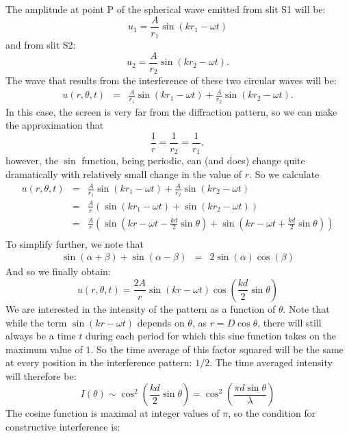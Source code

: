 \documentclass[12pt]{article}
\begin{document}
The amplitude at point P of the spherical wave emitted from slit S1 will be:
\begin{displaymath}
u_1 = \frac{A}{r_1} \sin(k r_1- \omega t)
\end{displaymath}
and from slit S2:
\begin{displaymath}
u_2 = \frac{A}{r_2} \sin(k r_2- \omega t).
\end{displaymath}
The wave that results from the interference of these two circular waves will be:
\begin{eqnarray*}
u(r,\theta,t) &=& \frac{A}{r_1} \sin(k r_1- \omega t) + \frac{A}{r_2} \sin(k r_2- \omega t).
\end{eqnarray*}
In this case, the screen is very far from the diffraction pattern, so we can make the approximation that
\begin{displaymath}
\frac{1}{r} = \frac{1}{r_2} = \frac{1}{r_1},
\end{displaymath}
however, the $\sin$ function, being periodic, can (and does) change quite dramatically with relatively small change in the value of $r$.  So we calculate
\begin{eqnarray*}
u(r,\theta,t) &=& \frac{A}{r_1} \sin(k r_1- \omega t) + \frac{A}{r_2} \sin(k r_2- \omega t) \\
&=& \frac{A}{r} \left( \sin(k r_1- \omega t) + \sin(k r_2- \omega t) \right) \\
&=& \frac{A}{r} \left( \sin(k r- \omega t - \frac{kd}{2}\sin\theta) + \sin(k r- \omega t +  \frac{kd}{2}\sin\theta) \right) \\
\end{eqnarray*}
To simplify further, we note that
\begin{eqnarray*}
\sin(\alpha + \beta) + \sin(\alpha - \beta) &=&  2 \sin (\alpha) \cos (\beta)
\end{eqnarray*}
And so we finally obtain:
\begin{equation}
u(r,\theta,t) =  \frac{2A}{r} \sin(k r- \omega t) \cos \left( \frac{kd}{2}\sin\theta \right)  
\end{equation}
We are interested in the intensity of the pattern as a function of $\theta.$  Note that while the term $\sin(kr-\omega t)$ depends on $\theta$, as $r = D \cos \theta$, there will still always be a time $t$ during each period for which this sine function takes on the maximum value of $1$.  So the time average of this factor squared will be the same at every position in the interference pattern:  $1/2$.  The time averaged intensity will therefore be:
\begin{equation} \label{eqn:interference}
I(\theta) \sim \cos^2 \left( \frac{kd}{2}\sin\theta \right) = \cos^2\left( \frac{\pi d \sin \theta}{\lambda}\right)
\end{equation}
 The cosine function is maximal at integer values of $\pi$, so the condition for constructive interference is:
\end{document}
